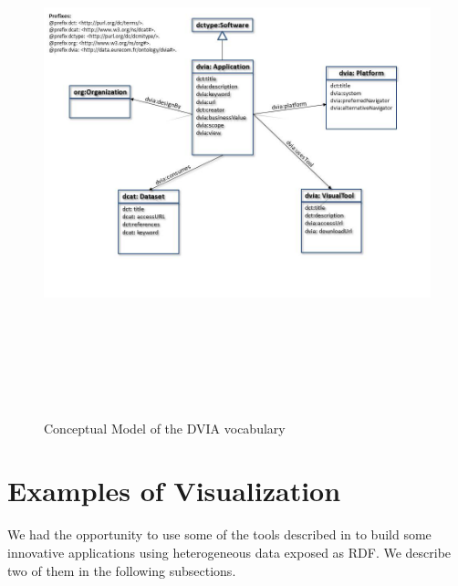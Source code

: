 \documentclass[a4paper,11pt]{report}
\begin{document}
\begin{landscape}
\begin{figure}[!htbp]
\begin{center}
      \includegraphics[bb = 92 86 545 742, height=6in]{visuGraphModel.jpg}
    \fi
    \caption{Conceptual Model of the DVIA vocabulary }
    \label{visuGraphModel}
  \end{center}
\end{figure}
\end{landscape}



\section{Examples of Visualization}
We had the opportunity to use some of the tools described in \cite{deliverable2012b} to build some innovative applications using heterogeneous data exposed as RDF. We describe two of them in the following subsections.
 
\end{document}

